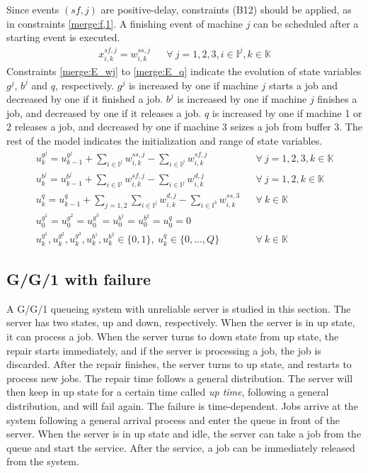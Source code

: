 \documentclass[suppldata]{interact}
\theoremstyle{plain}
\theoremstyle{definition}
\theoremstyle{remark}
\begin{document}
Since events ${(sf,j)}$ are positive-delay, constraints (B12) should be applied, as in constraints \eqref{merge:f,1}. A finishing event of machine $j$ can be scheduled after a starting event is executed. 
\begin{eqnarray}
	x^{sf,j}_{i,k} = w^{ss,j}_{i,k} && \forall\ j=1,2,3, i\in \mathbb{I}^{j},k\in \mathbb{K}\label{merge:f,1}
\end{eqnarray}
Constraints \eqref{merge:E_wj} to \eqref{merge:E_q} indicate the evolution of state variables $g^j$, $b^j$ and $q$, respectively. $g^j$ is increased by one if machine $j$ starts a job and decreased by one if it finished a job. $b^j$ is increased by one if machine $j$ finishes a job, and decreased by one if it releases a job. $q$ is increased by one if machine 1 or 2 releases a job, and decreased by one if machine 3 seizes a job from buffer 3. The rest of the model indicates the initialization and range of state variables.
\begin{eqnarray}
	u^{g^j}_k=u^{g^j}_{k-1}+ \sum_{i\in\mathbb{I}^j}w^{ss,j}_{i,k}-\sum_{i\in\mathbb{I}^j}w^{sf,j}_{i,k}&& \forall\ j=1,2,3, k\in \mathbb{K}\label{merge:E_wj}\\
	u^{b^j}_k=u^{b^j}_{k-1}+ \sum_{i\in\mathbb{I}^j}w^{sf,j}_{i,k}-\sum_{i\in\mathbb{I}^j}w^{d,j}_{i,k}&& \forall\ j=1,2, k\in \mathbb{K}\label{merge:E_bj}\\
	u^{q}_k=u^{q}_{k-1}+\sum_{j=1,2}\sum_{i\in\mathbb{I}^j}w^{d,j}_{i,k}-\sum_{i\in\mathbb{I}^3}w^{ss,3}_{i,k}&& \forall\ k\in \mathbb{K}\label{merge:E_q}\\
	u^{g^1}_0=u^{g^2}_0=u^{g^3}_0=u^{b^1}_0=u^{b^2}_0=u^{q}_0=0\nonumber\\
	u^{g^1}_{k},u^{g^2}_{k},u^{g^3}_{k},u^{b^1}_{k},u^{b^2}_{k}\in\{0,1\},\ u^q_{k}\in\{0,...,Q\}&& \forall\ k\in \mathbb{K}\nonumber
\end{eqnarray}




\subsection{G/G/1 with failure}
A G/G/1 queueing system with unreliable server is studied in this section. The server has two states, up and down, respectively. When the server is in up state, it can process a job. When the server turns to down state from up state, the repair starts immediately, and if the server is processing a job, the job is discarded. After the repair finishes, the server turns to up state, and restarts to process new jobs. The repair time follows a general distribution. The server will then keep in up state for a certain time called \textit{up time}, following a general distribution, and will fail again. The failure is time-dependent. Jobs arrive at the system following a general arrival process and enter the queue in front of the server. When the server is in up state and idle, the server can take a job from the queue and start the service. After the service, a job can be immediately released from the system.
\end{document}
